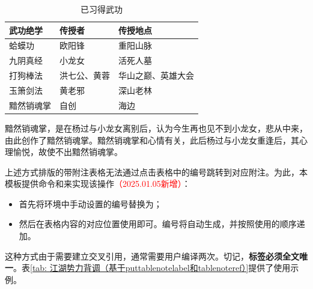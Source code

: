 \begin{table}[!ht]
    \caption{已习得武功} \label{tab: 已习得武功}
    \begin{threeparttable}
        \begin{tabular}{p{3cm} p{3cm} p{5cm}}
            \toprule
            \textbf{武功绝学} & \textbf{传授者} & \textbf{传授地点} \\
            \midrule
            蛤蟆功 & 欧阳锋 & 重阳山脉 \\
            九阴真经 & 小龙女 & 活死人墓 \\
            打狗棒法 & 洪七公、黄蓉 & 华山之巅、英雄大会 \\
            玉箫剑法 & 黄老邪 & 深山老林 \\
            黯然销魂掌\tnote{1} & 自创 & 海边 \\
            \bottomrule
        \end{tabular}
        \begin{tablenotes}[online]
            \item[1] 黯然销魂掌，是在杨过与小龙女离别后，认为今生再也见不到小龙女，悲从中来，由此创作了黯然销魂掌。黯然销魂掌和心情有关，此后杨过与小龙女重逢后，其心理愉悦，故使不出黯然销魂掌。
        \end{tablenotes}
    \end{threeparttable}
\end{table}

上述方式排版的带附注表格无法通过点击表格中的编号跳转到对应附注。为此，本模板提供命令和来实现该操作\textcolor{red}{（2025.01.05新增）}：

\begin{itemize}
    \item 首先将环境中手动设置的编号替换为；
    \item 然后在表格内容的对应位置使用即可。编号将自动生成，并按照使用的顺序递加。
\end{itemize}

这种方式由于需要建立交叉引用，通常需要用户编译两次。切记，\textbf{标签必须全文唯一}。表\ref{tab: 江湖势力背调（基于puttablenotelabel和tablenoteref）}提供了使用示例。

